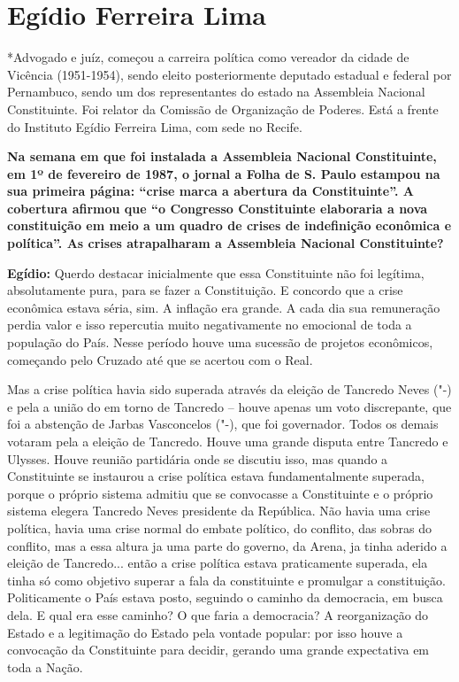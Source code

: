 \chapter{Egídio Ferreira Lima}

*Advogado e juíz, começou a carreira política como vereador da cidade de
Vicência (1951-1954), sendo eleito posteriormente deputado estadual e
federal por Pernambuco, sendo um dos representantes do estado na
Assembleia Nacional Constituinte. Foi relator da Comissão de Organização
de Poderes. Está a frente do Instituto Egídio Ferreira Lima, com sede no
Recife.

\textbf{Na semana em que foi instalada a Assembleia Nacional
Constituinte, em 1º de fevereiro de 1987, o jornal a Folha de S. Paulo
estampou na sua primeira página: ``crise marca a abertura da
Constituinte''. A cobertura afirmou que ``o Congresso Constituinte
elaboraria a nova constituição em meio a um quadro de crises de
indefinição econômica e política''. As crises atrapalharam a Assembleia
Nacional Constituinte?}

\textbf{Egídio:} Querdo destacar inicialmente que essa Constituinte não
foi legítima, absolutamente pura, para se fazer a Constituição. E
concordo que a crise econômica estava séria, sim. A inflação era grande.
A cada dia sua remuneração perdia valor e isso repercutia muito
negativamente no emocional de toda a população do País. Nesse período
houve uma sucessão de projetos econômicos, começando pelo Cruzado até
que se acertou com o Real.

Mas a crise política havia sido superada através da eleição de Tancredo
Neves ("-) e pela a união do  em torno de Tancredo -- houve
apenas um voto discrepante, que foi a abstenção de Jarbas Vasconcelos
("-), que foi governador. Todos os demais votaram pela a eleição de
Tancredo. Houve uma grande disputa entre Tancredo e Ulysses. Houve
reunião partidária onde se discutiu isso, mas quando a Constituinte se
instaurou a crise política estava fundamentalmente superada, porque o
próprio sistema admitiu que se convocasse a Constituinte e o próprio
sistema elegera Tancredo Neves presidente da República. Não havia uma
crise política, havia uma crise normal do embate político, do conflito,
das sobras do conflito, mas a essa altura ja uma parte do governo, da
Arena, ja tinha aderido a eleição de Tancredo... então a crise política
estava praticamente superada, ela tinha só como objetivo superar a fala
da constituinte e promulgar a constituição. Politicamente o País estava
posto, seguindo o caminho da democracia, em busca dela. E qual era esse
caminho? O que faria a democracia? A reorganização do Estado e a
legitimação do Estado pela vontade popular: por isso houve a convocação
da Constituinte para decidir, gerando uma grande expectativa em toda a
Nação.

